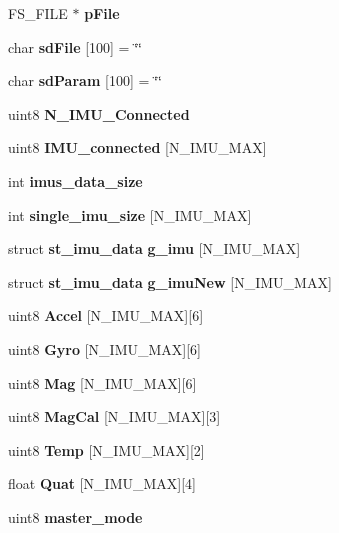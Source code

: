 \begin{DoxyCompactItemize}
\mbox{\label{globals_8c_a28568209e5c79332f574608aafcd14ec}} 
F\+S\+\_\+\+F\+I\+LE $\ast$ {\bfseries p\+File}
\item 
\mbox{\label{globals_8c_a93ea3c816e507e10c5a48cb79d624863}} 
char {\bfseries sd\+File} [100] = \char`\"{}\char`\"{}
\item 
\mbox{\label{globals_8c_ad49779e5c549cf4cb332a929eacc6b71}} 
char {\bfseries sd\+Param} [100] = \char`\"{}\char`\"{}
\item 
\mbox{\label{globals_8c_a47118db87acd24ae6dac18b036f360ec}} 
uint8 {\bfseries N\+\_\+\+I\+M\+U\+\_\+\+Connected}
\item 
\mbox{\label{globals_8c_a99668f3210aba0be3baec19486621bce}} 
uint8 {\bfseries I\+M\+U\+\_\+connected} [N\+\_\+\+I\+M\+U\+\_\+\+M\+AX]
\item 
\mbox{\label{globals_8c_a86272fcfcab512d38a11824196df4bbc}} 
int {\bfseries imus\+\_\+data\+\_\+size}
\item 
\mbox{\label{globals_8c_aca96c483c3e269e3805aa861ced0aef5}} 
int {\bfseries single\+\_\+imu\+\_\+size} [N\+\_\+\+I\+M\+U\+\_\+\+M\+AX]
\item 
\mbox{\label{globals_8c_ab72cce926a6439eda41315f45a9c379c}} 
struct \textbf{ st\+\_\+imu\+\_\+data} {\bfseries g\+\_\+imu} [N\+\_\+\+I\+M\+U\+\_\+\+M\+AX]
\item 
\mbox{\label{globals_8c_abb00fd907d732c0691940f718e231178}} 
struct \textbf{ st\+\_\+imu\+\_\+data} {\bfseries g\+\_\+imu\+New} [N\+\_\+\+I\+M\+U\+\_\+\+M\+AX]
\item 
\mbox{\label{globals_8c_a187c605f3898cf11e09f6f469c265920}} 
uint8 {\bfseries Accel} [N\+\_\+\+I\+M\+U\+\_\+\+M\+AX][6]
\item 
\mbox{\label{globals_8c_a49dba88a31d1b3b4190065b9ef1649fe}} 
uint8 {\bfseries Gyro} [N\+\_\+\+I\+M\+U\+\_\+\+M\+AX][6]
\item 
\mbox{\label{globals_8c_a5d88408ccb73729f049a52b4d1daaadf}} 
uint8 {\bfseries Mag} [N\+\_\+\+I\+M\+U\+\_\+\+M\+AX][6]
\item 
\mbox{\label{globals_8c_a1e598e1bdae5fe927fbd1f396161f3a6}} 
uint8 {\bfseries Mag\+Cal} [N\+\_\+\+I\+M\+U\+\_\+\+M\+AX][3]
\item 
\mbox{\label{globals_8c_af5f2d49e123a057d358297a34194ebdc}} 
uint8 {\bfseries Temp} [N\+\_\+\+I\+M\+U\+\_\+\+M\+AX][2]
\item 
\mbox{\label{globals_8c_a79179edea7394e7176f8768b1b0f6f92}} 
float {\bfseries Quat} [N\+\_\+\+I\+M\+U\+\_\+\+M\+AX][4]
\item 
uint8 \textbf{ master\+\_\+mode}
\end{DoxyCompactItemize}


